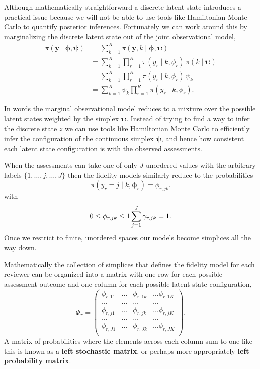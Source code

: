 \documentclass[
  letterpaper,
  DIV=11,
  numbers=noendperiod]{scrartcl}
\begin{document}
Although mathematically straightforward a discrete latent state
introduces a practical issue because we will not be able to use tools
like Hamiltonian Monte Carlo to quantify posterior inferences.
Fortunately we can work around this by marginalizing the discrete latent
state out of the joint observational model, \begin{align*}
\pi( \mathbf{y} \mid \boldsymbol{\phi}, \boldsymbol{\psi} )
&=
\sum_{k = 1}^{K} \pi( \mathbf{y}, k \mid
                      \boldsymbol{\phi}, \boldsymbol{\psi})
\\
&=
\sum_{k = 1}^{K} \prod_{r = 1}^{R} \pi( y_{r} \mid k, \phi_{r}) \,
                 \pi(k \mid \boldsymbol{\psi} )
\\
&=
\sum_{k = 1}^{K} \prod_{r = 1}^{R} \pi( y_{r} \mid k, \phi_{r}) \,
                 \psi_{k}
\\
&=
\sum_{k = 1}^{K} \psi_{k} \prod_{r = 1}^{R} \pi( y_{r} \mid k, \phi_{r}).
\end{align*}

In words the marginal observational model reduces to a mixture over the
possible latent states weighted by the simplex \(\boldsymbol{\psi}\).
Instead of trying to find a way to infer the discrete state \(z\) we can
use tools like Hamiltonian Monte Carlo to efficiently infer the
configuration of the continuous simplex \(\boldsymbol{\psi}\), and hence
how consistent each latent state configuration is with the observed
assessments.

When the assessments can take one of only \(J\) unordered values with
the arbitrary labels \(\{1, \ldots, j, \ldots, J \}\) then the fidelity
models similarly reduce to the probabilities \[
\pi( y_{r} = j \mid k, \boldsymbol{\phi}_{r}) = \phi_{r, jk}.
\] with \[
0 \le \phi_{r, jk} \le 1
\\
\sum_{j = 1}^{J} \gamma_{r, jk} = 1.
\] Once we restrict to finite, unordered spaces our models become
simplices all the way down.

Mathematically the collection of simplices that defines the fidelity
model for each reviewer can be organized into a matrix with one row for
each possible assessment outcome and one column for each possible latent
state configuration, \[
\Phi_{r} =
\left( \begin{array}{ccccc}
\phi_{r, 11} & \ldots & \phi_{r, 1k} & \ldots \phi_{r, 1K} \\
\ldots       & \ldots & \ldots       & \ldots              \\
\phi_{r, j1} & \ldots & \phi_{r, jk} & \ldots \phi_{r, jK} \\
\ldots       & \ldots & \ldots       & \ldots              \\
\phi_{r, J1} & \ldots & \phi_{r, Jk} & \ldots \phi_{r, JK} \\
\end{array} \right).
\] A matrix of probabilities where the elements across each column sum
to one like this is known as a \textbf{left stochastic matrix}, or
perhaps more appropriately \textbf{left probability matrix}.
\end{document}
